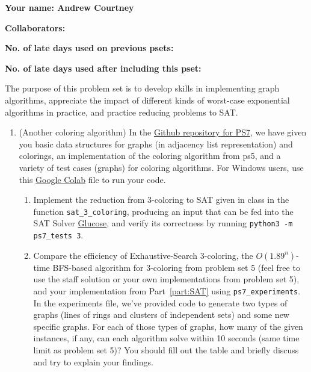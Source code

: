\documentclass[11pt]{article}
\begin{document}

\textbf{Your name: Andrew Courtney}

\textbf{Collaborators: }

\textbf{No. of late days used on previous psets: }

\textbf{No. of late days used after including this pset: }


The purpose of this problem set is to develop skills in implementing graph algorithms, appreciate the impact of different kinds of worst-case exponential algorithms in practice, and practice reducing problems to SAT.
\begin{enumerate}

    \item (Another coloring algorithm) 
  In the \href{https://github.com/Harvard-CS-120/cs120/tree/main/fall2022/psets/ps7}{Github repository for PS7}, we have given you basic data structures for graphs (in adjacency list representation) and colorings, an implementation of the coloring algorithm from ps5, and a variety of test cases (graphs) for coloring algorithms. For Windows users, use this \href{https://colab.research.google.com/drive/13nMhNMaDstVaEkxye61m8AV7nk9ks9uS#scrollTo=AbIalcylVVuu}{Google Colab} file to run your code.
  
  \begin{enumerate}      
      \item Implement the reduction from 3-coloring to SAT given in class in the function \texttt{sat\_3\_coloring}, producing an input that can be fed into the SAT Solver \href{https://pysathq.github.io/usage/}{Glucose}, and verify its correctness by running \texttt{python3 -m ps7\_tests 3}. \label{part:SAT}
      \item Compare the efficiency of Exhaustive-Search 3-coloring, the $O(1.89^n)$-time BFS-based algorithm for 3-coloring from problem set 5 (feel free to use the staff solution or your own implementations from problem set 5), and your implementation from Part~\ref{part:SAT} using \texttt{ps7\_experiments}. In the experiments file, we've provided code to generate two types of graphs (lines of rings and clusters of independent sets) and some new specific graphs. For each of those types of graphs, how many of the given instances, if any, can each algorithm solve within 10 seconds (same time limit as problem set 5)? You should fill out the table and briefly discuss and try to explain your findings.


\end{enumerate}
\end{enumerate}
\end{document}
